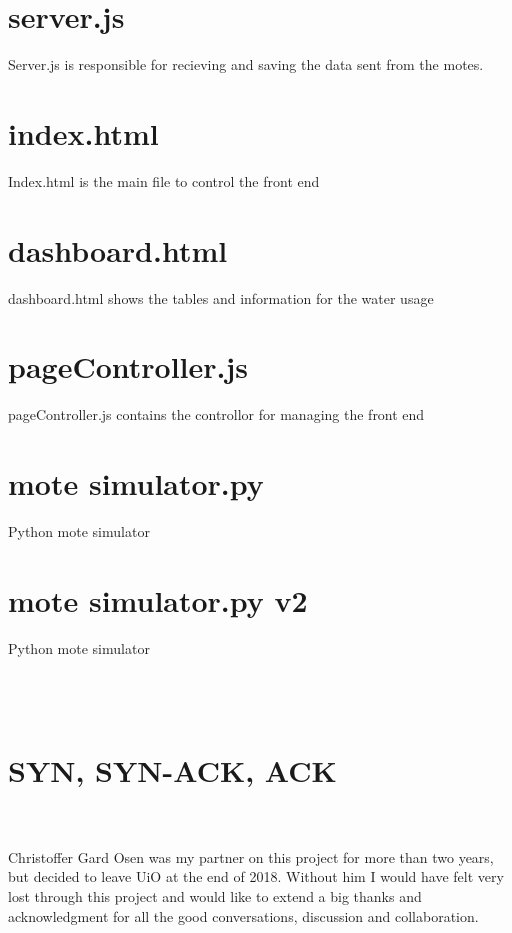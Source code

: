 \documentclass[]{uiophd}
\begin{document}
\section*{server.js}
Server.js is responsible for recieving and saving the data sent from the motes.


\section*{index.html}
Index.html is the main file to control the front end


\section*{dashboard.html}
dashboard.html shows the tables and information for the water usage


\section*{pageController.js}
pageController.js contains the controllor for managing the front end


\section*{mote simulator.py}
Python mote simulator


\section*{mote simulator.py v2}
Python mote simulator

\\\\
\section*{SYN, SYN-ACK, ACK}
\\\\
Christoffer Gard Osen was my partner on this project for more than two years, but decided to leave UiO at the end of 2018. Without him I would have felt very lost through this project and would like to extend a big thanks and acknowledgment for all the good conversations, discussion and collaboration.
\end{document}
